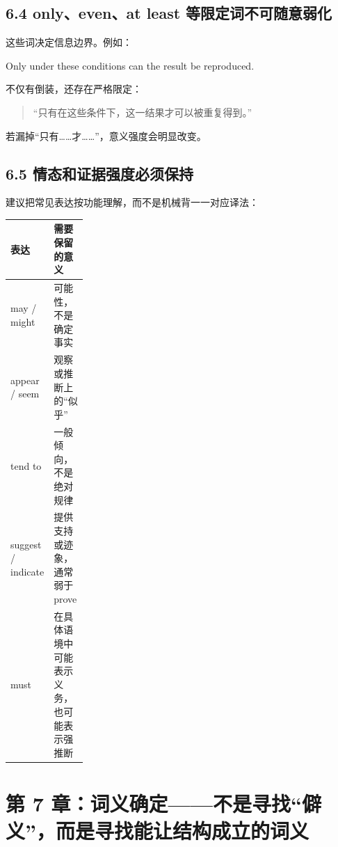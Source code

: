 \documentclass[11pt,a4paper]{ctexart}
\begin{document}
\subsection{6.4 only、even、at least 等限定词不可随意弱化}
这些词决定信息边界。例如：
\begin{eng}[例 17]
Only under these conditions can the result be reproduced.
\end{eng}
不仅有倒装，还存在严格限定：
\begin{quote}
“只有在这些条件下，这一结果才可以被重复得到。”
\end{quote}
若漏掉“只有……才……”，意义强度会明显改变。

\subsection{6.5 情态和证据强度必须保持}
建议把常见表达按功能理解，而不是机械背一一对应译法：
\begin{center}
\small
\begin{tabularx}{0.92\linewidth}{>{\ttfamily}p{0.22\linewidth} X}
\toprule
表达 & 需要保留的意义 \\
\midrule
may / might & 可能性，不是确定事实 \\
appear / seem & 观察或推断上的“似乎” \\
tend to & 一般倾向，不是绝对规律 \\
suggest / indicate & 提供支持或迹象，通常弱于 prove \\
must & 在具体语境中可能表示义务，也可能表示强推断 \\
\bottomrule
\end{tabularx}
\end{center}

\section{第 7 章：词义确定——不是寻找“僻义”，而是寻找能让结构成立的词义}
\end{document}

